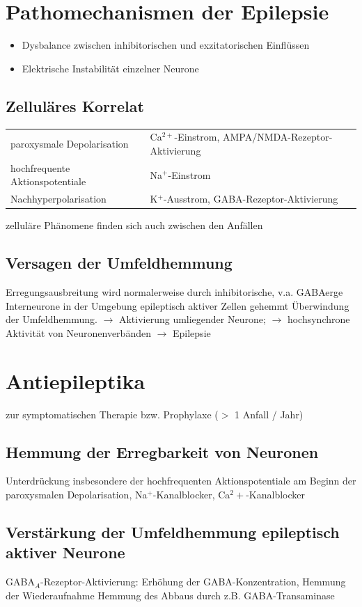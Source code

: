 \documentclass[10pt,a4paper]{report}
\begin{document}
\section{Pathomechanismen der Epilepsie} %
\label{sec:pathomechanismen_der_epilepsie}
\begin{itemize}
	\item Dysbalance zwischen inhibitorischen und exzitatorischen Einflüssen
	\item Elektrische Instabilität einzelner Neurone
\end{itemize}
\subsection{Zelluläres Korrelat} %
\label{sub:zellul_res_korrelat}
\begin{tabularx}{\textwidth}{XX}
paroxysmale Depolarisation&Ca$^{2+}$-Einstrom, AMPA/NMDA-Rezeptor-Aktivierung\\
hochfrequente Aktionspotentiale&Na$^+$-Einstrom\\
Nachhyperpolarisation&K$^+$-Ausstrom, GABA-Rezeptor-Aktivierung\\
\end{tabularx}
zelluläre Phänomene finden sich auch zwischen den Anfällen
\subsection{Versagen der Umfeldhemmung} %
\label{sub:versagen_der_umfeldhemmung}
Erregungsausbreitung wird normalerweise durch inhibitorische, v.a. GABA­erge Interneurone in der Umgebung epileptisch aktiver Zellen gehemmt
Überwindung der Umfeldhemmung.
$\rightarrow$ 	Aktivierung umliegender Neurone; $\rightarrow$ 	hochsynchrone Aktivität von Neuronenverbänden $\rightarrow$ Epilepsie
\section{Antiepileptika} %
\label{sec:antiepileptika}
zur symptomatischen Therapie bzw. Prophylaxe ($>$ 1 Anfall / Jahr)
\subsection{Hemmung der Erregbarkeit von Neuronen} %
\label{sub:hemmung_der_erregbarkeit_von_neuronen}
Unterdrückung insbesondere der hochfrequenten Aktionspotentiale am Beginn der paroxysmalen Depolarisation, Na$^+$-Kanalblocker, Ca$^2+$-Kanalblocker
\subsection{Verstärkung der Umfeldhemmung epileptisch aktiver Neurone} %
\label{sub:verst_rkung_der_umfeldhemmung_epileptisch_aktiver_neurone}
GABA$_A$-Rezeptor-Aktivierung: Erhöhung der GABA-Konzentration, Hemmung der Wiederaufnahme
Hemmung des Abbaus durch z.B. GABA-Transaminase

\end{document}
